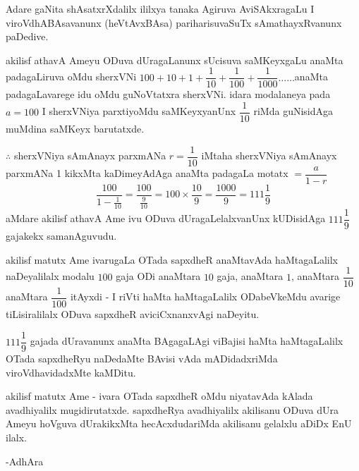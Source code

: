 Adare gaNita shAsatxrXdalilx ililxya tanaka Agiruva AviSAkxragaLu I viroVdhABAsa\-vanunx (heVtAvxBAsa) pariharisuvaSuTx sAmathayxRvanunx paDedive.

akilisf athavA Ameyu ODuva dUragaLanunx sUcisuva saMKeyxgaLu anaMta padagaLiruva oMdu sherxVNi $100+10+1+\dfrac{1}{10}+\dfrac{1}{100}+\dfrac{1}{1000}\ldots\ldots$anaMta padagaLavarege idu oMdu guNoVtatxra sherxVNi. idara modalaneya pada $a=100$ I sherxVNiya parxtiyoMdu saMKeyxyanUnx $\dfrac{1}{10}$ riMda guNisidAga muMdina saMKeyx barutatxde.

$\therefore$ sherxVNiya sAmAnayx parxmANa $r=\dfrac{1}{10}$ iMtaha sherxVNiya sAmAnayx parxmANa {\rm 1} kikxMta kaDimeyAdAga anaMta padagaLa motatx $=\dfrac{a}{1-r}$
$$
\frac{100}{1-\frac{1}{10}}=\frac{100}{\frac{9}{10}}=100\times \frac{10}{9}=\frac{1000}{9}=111\frac{1}{9}
$$
aMdare akilisf athavA Ame ivu ODuva dUragaLelalxvanUnx kUDisidAga $111\dfrac{1}{9}$ gajakekx samanAguvudu.

akilisf matutx Ame ivarugaLa OTada sapxdheR anaMtavAda haMtagaLalilx naDeyalilalx modalu $100$ gaja ODi anaMtara $10$ gaja, anaMtara $1$, anaMtara $\dfrac{1}{10}$ anaMtara $\dfrac{1}{100}$ itAyxdi - I riVti haMta haMtagaLalilx ODabeVkeMdu avarige tiLisiralilalx ODuva sapxdheR aviciCxnanxvAgi naDeyitu.

$111\dfrac{1}{9}$ gajada dUravanunx anaMta BAgagaLAgi viBajisi haMta haMtagaLalilx OTada sapxdheRyu naDedaMte BAvisi vAda mADidadxriMda viroVdhavidadxMte kaMDitu. 

akilisf matutx Ame - ivara OTada sapxdheR oMdu niyatavAda kAlada avadhiyalilx mugidirutatxde. sapxdheRya avadhiyalilx akilisanu ODuva dUra Ameyu hoVguva dUrakikxMta hecAcxdudariMda akilisanu gelalxlu aDiDx EnU ilalx.

\hfill{-AdhAra}

